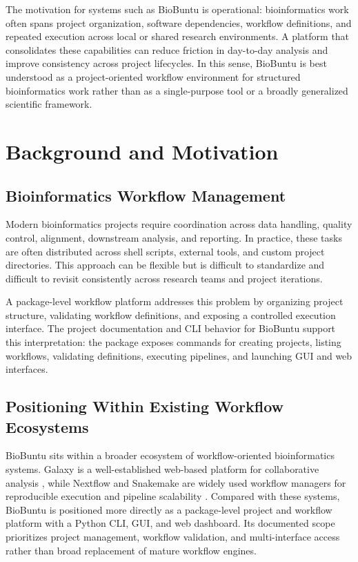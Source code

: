 \documentclass[10pt,conference]{IEEEtran}
\begin{document}
The motivation for systems such as BioBuntu is operational: bioinformatics work often spans project organization, software dependencies, workflow definitions, and repeated execution across local or shared research environments. A platform that consolidates these capabilities can reduce friction in day-to-day analysis and improve consistency across project lifecycles. In this sense, BioBuntu is best understood as a project-oriented workflow environment for structured bioinformatics work rather than as a single-purpose tool or a broadly generalized scientific framework.

\section{Background and Motivation}

\subsection{Bioinformatics Workflow Management}

Modern bioinformatics projects require coordination across data handling, quality control, alignment, downstream analysis, and reporting. In practice, these tasks are often distributed across shell scripts, external tools, and custom project directories. This approach can be flexible but is difficult to standardize and difficult to revisit consistently across research teams and project iterations.

A package-level workflow platform addresses this problem by organizing project structure, validating workflow definitions, and exposing a controlled execution interface. The project documentation and CLI behavior for BioBuntu support this interpretation: the package exposes commands for creating projects, listing workflows, validating definitions, executing pipelines, and launching GUI and web interfaces.

\subsection{Positioning Within Existing Workflow Ecosystems}

BioBuntu sits within a broader ecosystem of workflow-oriented bioinformatics systems. Galaxy is a well-established web-based platform for collaborative analysis \cite{afgan2016galaxy}, while Nextflow and Snakemake are widely used workflow managers for reproducible execution and pipeline scalability \cite{di2017nextflow, koster2012snakemake}. Compared with these systems, BioBuntu is positioned more directly as a package-level project and workflow platform with a Python CLI, GUI, and web dashboard. Its documented scope prioritizes project management, workflow validation, and multi-interface access rather than broad replacement of mature workflow engines.
\end{document}
